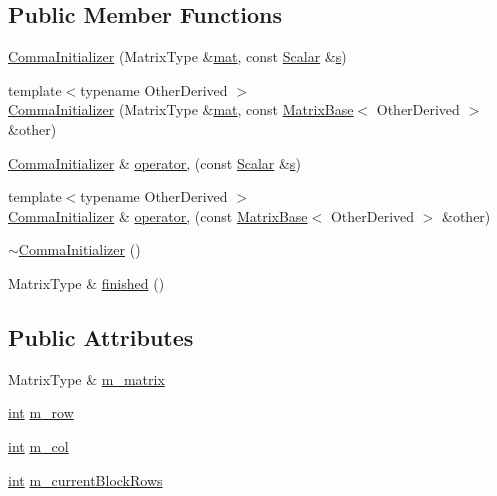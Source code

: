 \subsection*{Public Member Functions}
\begin{DoxyCompactItemize}
\item 
\hyperlink{struct_comma_initializer_abd1743417b22ba3e26e635e74f159c7b}{Comma\-Initializer} (Matrix\-Type \&\hyperlink{uavobjecttemplate_8m_a16a51e808b16c46bbfd36da2e37cd123}{mat}, const \hyperlink{struct_comma_initializer_a9403fcf77305aeadb8c8d90132e94dc4}{Scalar} \&\hyperlink{glext_8h_ad585a1393cfa368fa9dc3d8ebff640d5}{s})
\item 
{\footnotesize template$<$typename Other\-Derived $>$ }\\\hyperlink{struct_comma_initializer_adeb647c5d6940e80db20fb6ac1bd7439}{Comma\-Initializer} (Matrix\-Type \&\hyperlink{uavobjecttemplate_8m_a16a51e808b16c46bbfd36da2e37cd123}{mat}, const \hyperlink{class_matrix_base}{Matrix\-Base}$<$ Other\-Derived $>$ \&other)
\item 
\hyperlink{struct_comma_initializer}{Comma\-Initializer} \& \hyperlink{struct_comma_initializer_ad42449d0dbc1031a3a76048dfd55e701}{operator,} (const \hyperlink{struct_comma_initializer_a9403fcf77305aeadb8c8d90132e94dc4}{Scalar} \&\hyperlink{glext_8h_ad585a1393cfa368fa9dc3d8ebff640d5}{s})
\item 
{\footnotesize template$<$typename Other\-Derived $>$ }\\\hyperlink{struct_comma_initializer}{Comma\-Initializer} \& \hyperlink{struct_comma_initializer_a8a51e3328b7214b99441e7737e54a3f7}{operator,} (const \hyperlink{class_matrix_base}{Matrix\-Base}$<$ Other\-Derived $>$ \&other)
\item 
\hyperlink{struct_comma_initializer_a384c3fe5572811ea9dd4f6a49a548134}{$\sim$\-Comma\-Initializer} ()
\item 
Matrix\-Type \& \hyperlink{struct_comma_initializer_a259ebbcaa9e86e982e4685aa0aa1e03a}{finished} ()
\end{DoxyCompactItemize}
\subsection*{Public Attributes}
\begin{DoxyCompactItemize}
\item 
Matrix\-Type \& \hyperlink{struct_comma_initializer_a7c8dc2c76a0f96266f67da34a9a8e70f}{m\-\_\-matrix}
\item 
\hyperlink{ioapi_8h_a787fa3cf048117ba7123753c1e74fcd6}{int} \hyperlink{struct_comma_initializer_a14c027351cb2b9c4945c7ff808570c35}{m\-\_\-row}
\item 
\hyperlink{ioapi_8h_a787fa3cf048117ba7123753c1e74fcd6}{int} \hyperlink{struct_comma_initializer_ac15db27bfc1bee981760ed9f31234c2d}{m\-\_\-col}
\item 
\hyperlink{ioapi_8h_a787fa3cf048117ba7123753c1e74fcd6}{int} \hyperlink{struct_comma_initializer_a109c47338fbe98963a21a83c651bc883}{m\-\_\-current\-Block\-Rows}
\end{DoxyCompactItemize}


